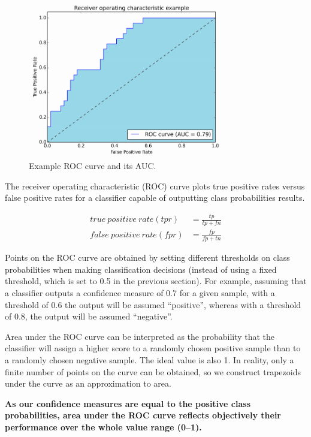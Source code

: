 \documentclass[11pt,a4paper]{report}
\begin{document}
\begin{figure}[htbp]
  \centering
  \includegraphics[width=0.8\textwidth]{roc-auc.png}
  \caption{Example ROC curve and its AUC.} \label{fig:roc}
\end{figure}

The receiver operating characteristic (ROC) curve plots true positive rates versus false positive rates for a classifier capable of outputting class probabilities results.

\begin{align*}
  true\ positive\ rate (tpr) & = \frac{tp}{tp+fn} \\
  false\ positive\ rate (fpr) & = \frac{fp}{fp+tn}
\end{align*}

Points on the ROC curve are obtained by setting different thresholds on class probabilities when making classification decisions (instead of using a fixed threshold, which is set to 0.5 in the previous section).
For example, assuming that a classifier outputs a confidence measure of 0.7 for a given sample, with a threshold of 0.6 the output will be assumed \enquote{positive}, whereas with a threshold of 0.8, the output will be assumed \enquote{negative}.

Area under the ROC curve can be interpreted as the probability that the classifier will assign a higher score to a randomly chosen positive sample than to a randomly chosen negative sample.
The ideal value is also 1.
In reality, only a finite number of points on the curve can be obtained, so we construct trapezoids under the curve as an approximation to area.

\textbf{As our confidence measures are equal to the positive class probabilities, area under the ROC curve reflects objectively their performance over the whole value range (\numrange{0}{1}).}
\end{document}
